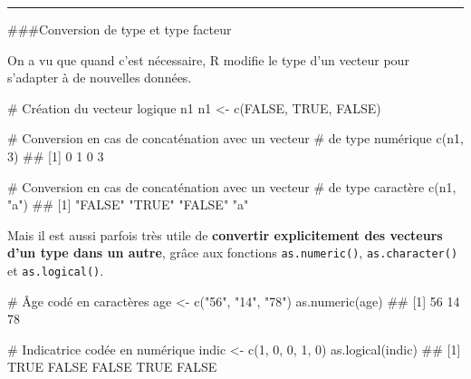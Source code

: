 \documentclass[12pt,twosided, notitlepage]{book}
\newenvironment{Shaded}{}{}
\newcommand{\CommentTok}[1]{\textcolor[rgb]{0.00,0.50,0.00}{#1}}
\newcommand{\DecValTok}[1]{#1}
\newcommand{\KeywordTok}[1]{\textcolor[rgb]{0.00,0.00,1.00}{#1}}
\newcommand{\NormalTok}[1]{#1}
\newcommand{\OtherTok}[1]{\textcolor[rgb]{1.00,0.25,0.00}{#1}}
\newcommand{\StringTok}[1]{\textcolor[rgb]{0.00,0.50,0.50}{#1}}
\renewenvironment{Shaded}{\begin{snugshade}}{\end{snugshade}}
\begin{document}
\begin{center}\rule{0.5\linewidth}{\linethickness}\end{center}

\#\#\#Conversion de type et type facteur

On a vu que quand c'est nécessaire, R modifie le type d'un vecteur pour
s'adapter à de nouvelles données.

\begin{Shaded}
\begin{Highlighting}[]
\CommentTok{# Création du vecteur logique n1}
\NormalTok{n1 <-}\StringTok{ }\KeywordTok{c}\NormalTok{(}\OtherTok{FALSE}\NormalTok{, }\OtherTok{TRUE}\NormalTok{, }\OtherTok{FALSE}\NormalTok{)}

\CommentTok{# Conversion en cas de concaténation avec un vecteur }
\CommentTok{# de type numérique}
\KeywordTok{c}\NormalTok{(n1, }\DecValTok{3}\NormalTok{)}
\NormalTok{  ## [1] 0 1 0 3}

\CommentTok{# Conversion en cas de concaténation avec un vecteur }
\CommentTok{# de type caractère}
\KeywordTok{c}\NormalTok{(n1, }\StringTok{"a"}\NormalTok{)}
\NormalTok{  ## [1] "FALSE" "TRUE"  "FALSE" "a"}
\end{Highlighting}
\end{Shaded}

Mais il est aussi parfois très utile de \textbf{convertir explicitement
des vecteurs d'un type dans un autre}, grâce aux fonctions
\texttt{as.numeric()},
\texttt{as.character()} et
\texttt{as.logical()}.

\begin{Shaded}
\begin{Highlighting}[]
\CommentTok{# Âge codé en caractères}
\NormalTok{age <-}\StringTok{ }\KeywordTok{c}\NormalTok{(}\StringTok{"56"}\NormalTok{, }\StringTok{"14"}\NormalTok{, }\StringTok{"78"}\NormalTok{)}
\KeywordTok{as.numeric}\NormalTok{(age)}
\NormalTok{  ## [1] 56 14 78}

\CommentTok{# Indicatrice codée en numérique}
\NormalTok{indic <-}\StringTok{ }\KeywordTok{c}\NormalTok{(}\DecValTok{1}\NormalTok{, }\DecValTok{0}\NormalTok{, }\DecValTok{0}\NormalTok{, }\DecValTok{1}\NormalTok{, }\DecValTok{0}\NormalTok{)}
\KeywordTok{as.logical}\NormalTok{(indic)}
\NormalTok{  ## [1]  TRUE FALSE FALSE  TRUE FALSE}
\end{Highlighting}
\end{Shaded}
\end{document}
